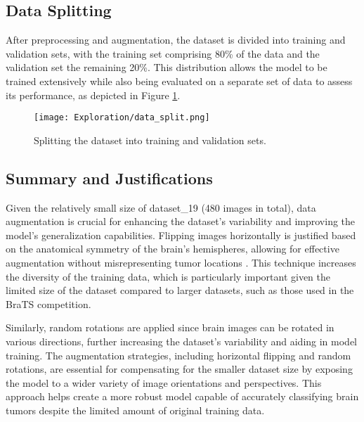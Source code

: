 \subsection{Data Splitting}\label{data_splitting}
After preprocessing and augmentation, the dataset is divided into training and validation sets, with the training set comprising 80\% of the data and the validation set the remaining 20\%. This distribution allows the model to be trained extensively while also being evaluated on a separate set of data to assess its performance, as depicted in Figure \ref{fig:data_split}.

\begin{figure}[H]
  \begin{center}
    \texttt{[image: Exploration/data\_split.png]}
  \end{center}
  \caption{Splitting the dataset into training and validation sets.}\label{fig:data_split}
\end{figure}


\subsection{Summary and Justifications}

Given the relatively small size of dataset\_19 (480 images in total), data augmentation is crucial for enhancing the dataset's variability and improving the model's generalization capabilities. Flipping images horizontally is justified based on the anatomical symmetry of the brain's hemispheres, allowing for effective augmentation without misrepresenting tumor locations \cite{nalepa_data_2019}. This technique increases the diversity of the training data, which is particularly important given the limited size of the dataset compared to larger datasets, such as those used in the BraTS competition.

Similarly, random rotations are applied since brain images can be rotated in various directions, further increasing the dataset's variability and aiding in model training. The augmentation strategies, including horizontal flipping and random rotations, are essential for compensating for the smaller dataset size by exposing the model to a wider variety of image orientations and perspectives. This approach helps create a more robust model capable of accurately classifying brain tumors despite the limited amount of original training data.

